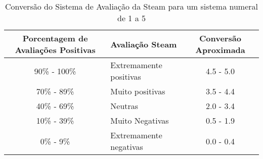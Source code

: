 \begin{table}[H]
	\caption{Conversão do Sistema de Avaliação da Steam para um sistema numeral de 1 a 5}
	\label{tab:avalicao_steam}
	\centering
	\footnotesize
	\begin{tabular}{clc}
		\toprule
		\textbf{Porcentagem de Avaliações Positivas} & \textbf{Avaliação Steam} & \textbf{Conversão Aproximada} \\
		\midrule
		90\% - 100\%                                 & Extremamente positivas   & 4.5 - 5.0                     \\
		70\% - 89\%                                  & Muito positivas          & 3.5 - 4.4                     \\
		40\% - 69\%                                  & Neutras                  & 2.0 - 3.4                     \\
		10\% - 39\%                                  & Muito Negativas          & 0.5 - 1.9                     \\
		0\% -  9\%                                   & Extremamente negativas   & 0.0 - 0.4                     \\
		\bottomrule
	\end{tabular}
\end{table}
